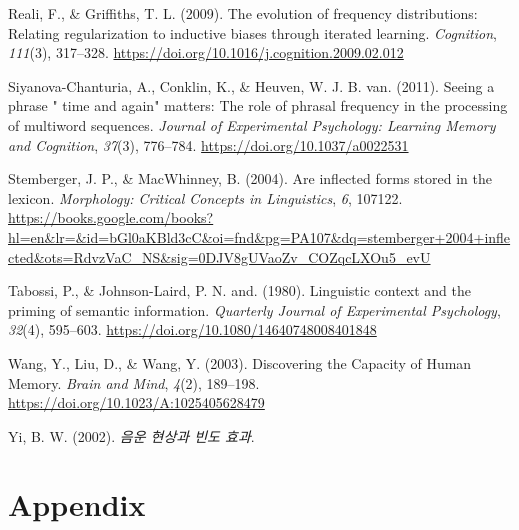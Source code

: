 \documentclass[
  12pt,
]{scrartcl}
\newlength{\cslhangindent}
\newenvironment{CSLReferences}[2] %
 {\begin{list}{}{%
  \setlength{\itemindent}{0pt}
  \setlength{\leftmargin}{0pt}
  \setlength{\parsep}{0pt}
  \ifodd #1
   \setlength{\leftmargin}{\cslhangindent}
   \setlength{\itemindent}{-1\cslhangindent}
  \fi
  \setlength{\itemsep}{#2\baselineskip}}}
 {\end{list}}
\begin{document}
\begin{CSLReferences}{1}{0}
Reali, F., \& Griffiths, T. L. (2009). The evolution of frequency
distributions: Relating regularization to inductive biases through
iterated learning. \emph{Cognition}, \emph{111}(3), 317--328.
\url{https://doi.org/10.1016/j.cognition.2009.02.012}

Siyanova-Chanturia, A., Conklin, K., \& Heuven, W. J. B. van. (2011).
Seeing a phrase {"} time and again{"} matters: The role of phrasal
frequency in the processing of multiword sequences. \emph{Journal of
Experimental Psychology: Learning Memory and Cognition}, \emph{37}(3),
776--784. \url{https://doi.org/10.1037/a0022531}

Stemberger, J. P., \& MacWhinney, B. (2004). Are inflected forms stored
in the lexicon. \emph{Morphology: Critical Concepts in Linguistics},
\emph{6}, 107122.
\url{https://books.google.com/books?hl=en&lr=&id=bGl0aKBld3cC&oi=fnd&pg=PA107&dq=stemberger+2004+inflected&ots=RdvzVaC_NS&sig=0DJV8gUVaoZv_COZqcLXOu5_evU}

Tabossi, P., \& Johnson-Laird, P. N. and. (1980). Linguistic context and
the priming of semantic information. \emph{Quarterly Journal of
Experimental Psychology}, \emph{32}(4), 595--603.
\url{https://doi.org/10.1080/14640748008401848}

Wang, Y., Liu, D., \& Wang, Y. (2003). Discovering the Capacity of Human
Memory. \emph{Brain and Mind}, \emph{4}(2), 189--198.
\url{https://doi.org/10.1023/A:1025405628479}

Yi, B. W. (2002). \emph{음운 현상과 빈도 효과}.

\end{CSLReferences}

\newpage

\section*{Appendix}\label{appendix}

\appendix

\renewcommand{\thesection}{\Alph{section}}

\setcounter{section}{0}
\end{document}
